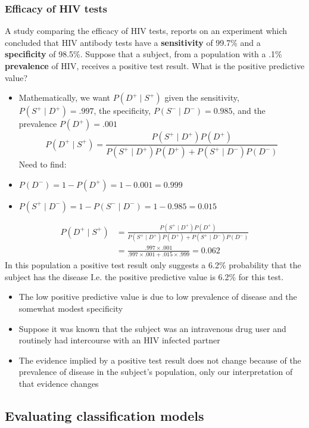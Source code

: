 \documentclass[a4paper]{article}\usepackage[]{graphicx}\usepackage[]{xcolor}
\begin{document}
\subsubsection{Efficacy of HIV tests}
A study comparing the efficacy of HIV tests, reports on an experiment which concluded that HIV antibody tests have a \textbf{sensitivity} of 99.7\% and a \textbf{specificity} of 98.5\%. Suppose that a subject, from a population with a .1\% \textbf{prevalence} of HIV, receives a positive test result. What is the positive predictive value?
\begin{itemize}
	\item Mathematically, we want \( P(D^+ \mid S^+) \) given the sensitivity, \( P(S^+ \mid D^+) =.997 \), the specificity, \( P(S^- \mid D^-) = 0.985 \), and the prevalence \( P(D^+) = .001 \)
	\[
		P(D^+ \mid S^+) = \frac{P(S^+ \mid D^+)P(D^+)}{P(S^+ \mid D^+)P(D^+) + P(S^+ \mid D^-)P(D^-)}
	\]
	Need to find:
	\item \( P(D^-) = 1-P(D^+) = 1- 0.001 = 0.999 \)
	\item \( P(S^+ \mid D^-) = 1-P(S^- \mid D^-) = 1 - 0.985 = 0.015 \) 
\end{itemize}
\begin{align*}
	P(D^+ \mid S^+) & = \frac{P(S^+ \mid D^+)P(D^+)}{P(S^+ \mid D^+)P(D^+) + P(S^+ \mid D^-)P(D^-)}\\
	& = \frac{.997\times .001}{.997 \times .001 + .015 \times .999}  = 0.062
\end{align*}
In this population a positive test result only suggests a 6.2\% probability that the subject has the disease I.e. the positive predictive value is 6.2\% for this test.
\begin{itemize}
	\item The low positive predictive value is due to low prevalence of disease and the somewhat modest specificity
	\item Suppose it was known that the subject was an intravenous drug user and routinely had intercourse with an HIV infected partner
	\item The evidence implied by a positive test result does not change because of the prevalence of disease in the subject's population, only our interpretation of that evidence changes
\end{itemize}
\subsection{Evaluating classification models}
\end{document}
